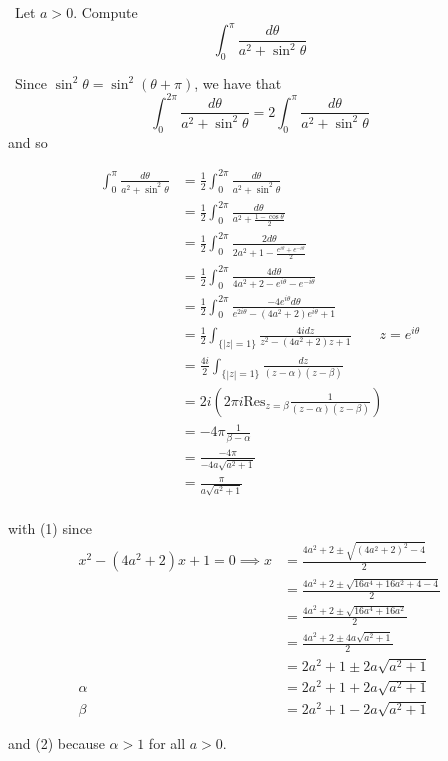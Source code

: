 \documentclass[12pt]{Homework}
\newcommand{\res}{\text{Res}}
\begin{document}
\begin{problem} $\,$
Let $a>0$. Compute $$\int_0^\pi\frac{d\theta}{a^2+\sin^2\theta}$$
\end{problem}


\begin{solution}$\,$
Since $\sin^2\theta=\sin^2(\theta+\pi)$, we have that $$\int_0^{2\pi}\frac{d\theta}{a^2+\sin^2\theta}=2\int_0^\pi\frac{d\theta}{a^2+\sin^2\theta}$$ and so

\begin{align*}
    \int_0^\pi\frac{d\theta}{a^2+\sin^2\theta}&=\frac{1}{2}\int_0^{2\pi}\frac{d\theta}{a^2+\sin^2\theta}\\
    &=\frac{1}{2}\int_0^{2\pi}\frac{d\theta}{a^2+\frac{1-\cos\theta}{2}}\\
    &=\frac{1}{2}\int_0^{2\pi}\frac{2d\theta}{2a^2+1-\frac{e^{i\theta}+e^{-i\theta}}{2}}\\
    &=\frac{1}{2}\int_0^{2\pi}\frac{4d\theta}{4a^2+2-e^{i\theta}-e^{-i\theta}}\\
    &=\frac{1}{2}\int_0^{2\pi}\frac{-4e^{i\theta}d\theta}{e^{2i\theta}-(4a^2+2)e^{i\theta}+1}\\
    &=\frac{1}{2}\int_{\{|z|=1\}}\frac{4idz}{z^2-(4a^2+2)z+1}\qquad z=e^{i\theta}\\
    &=\frac{4i}{2}\int_{\{|z|=1\}}\frac{dz}{(z-\alpha)(z-\beta)}\tag{1}\\
    &=2i\left(2\pi i\res_{z=\beta}\frac{1}{(z-\alpha)(z-\beta)}\right)\tag{2}\\
    &=-4\pi\frac{1}{\beta-\alpha}\\
    &=\frac{-4\pi}{-4a\sqrt{a^2+1}}\\
    &=\frac{\pi}{a\sqrt{a^2+1}}\\
\end{align*}

with (1) since \begin{align*}
    x^2-(4a^2+2)x+1=0\implies x&=\frac{4a^2+2\pm\sqrt{(4a^2+2)^2-4}}{2}\\
    &=\frac{4a^2+2\pm\sqrt{16a^4+16a^2+4-4}}{2}\\
    &=\frac{4a^2+2\pm\sqrt{16a^4+16a^2}}{2}\\
    &=\frac{4a^2+2\pm4a\sqrt{a^2+1}}{2}\\
    &=2a^2+1\pm2a\sqrt{a^2+1}\\
    \alpha&=2a^2+1+2a\sqrt{a^2+1}\\
    \beta&=2a^2+1-2a\sqrt{a^2+1}
\end{align*}

and (2) because $\alpha>1$ for all $a>0$.
\end{solution}
\newpage
\end{document}
